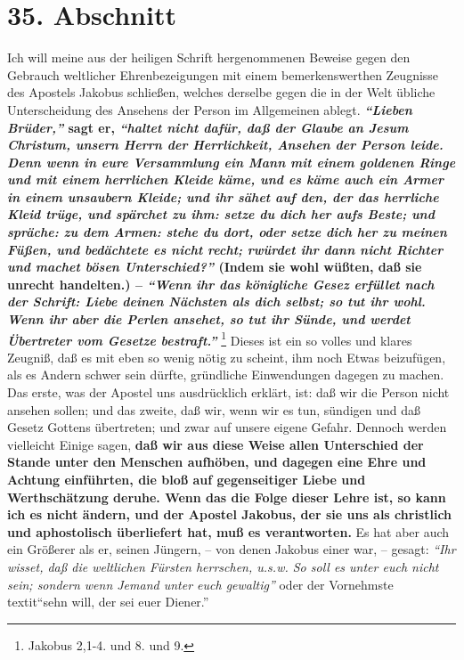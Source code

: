 \section{35. Abschnitt} \label{kap9_ab35}

Ich will meine aus der heiligen Schrift hergenommenen Beweise gegen den Gebrauch
weltlicher Ehrenbezeigungen mit einem bemerkenswerthen Zeugnisse des Apostels
Jakobus schließen, welches derselbe gegen die in der Welt übliche Unterscheidung
des Ansehens der Person im Allgemeinen ablegt.
\textbf{\textit{"`Lieben Brüder,"'} sagt er,
\textit{"`haltet nicht dafür, daß der Glaube an Jesum Christum, unsern Herrn der
Herrlichkeit, Ansehen der Person leide. Denn wenn in eure Versammlung ein Mann
mit einem goldenen Ringe und mit einem herrlichen Kleide käme, und es käme auch
ein Armer in einem unsaubern Kleide; und ihr sähet auf den, der das herrliche
Kleid trüge, und spärchet zu ihm: setze du dich her aufs Beste; und spräche: zu
dem Armen: stehe du dort, oder setze dich her zu meinen Füßen, und bedächtete es
nicht recht; rwürdet ihr dann nicht Richter und machet bösen Unterschied?"'}
(Indem sie wohl wüßten, daß sie unrecht handelten.) --\textit{ "`Wenn ihr das
königliche
Gesez erfüllet nach der Schrift: Liebe deinen Nächsten als dich selbst; so tut
ihr wohl. Wenn ihr aber die Perlen ansehet, so tut ihr Sünde, und werdet
Übertreter vom Gesetze bestraft."'}}
\footnote{Jakobus 2,1-4. und 8. und 9.}
Dieses ist
ein so volles und klares Zeugniß, daß es mit eben so wenig nötig zu scheint, ihm
noch Etwas beizufügen, als es Andern schwer sein dürfte, gründliche Einwendungen
dagegen zu machen. Das erste, was der Apostel uns ausdrücklich erklärt, ist: daß
wir die Person nicht ansehen sollen; und das zweite, daß wir, wenn wir es tun,
sündigen und daß Gesetz Gottens übertreten; und zwar auf unsere eigene Gefahr.
Dennoch werden vielleicht Einige sagen, \textbf{daß wir aus diese Weise allen
Unterschied der Stande unter den Menschen aufhöben, und dagegen eine Ehre und
Achtung einführten, die bloß auf gegenseitiger Liebe und Werthschätzung deruhe.
Wenn das die Folge dieser Lehre ist, so kann ich es nicht ändern, und der
Apostel Jakobus, der sie uns als christlich und aphostolisch überliefert hat,
muß es verantworten.} Es hat aber auch ein Größerer als er, seinen Jüngern, --
von denen Jakobus einer war, -- gesagt:
\textit{"`Ihr wisset, daß die weltlichen Fürsten
herrschen, u.s.w. So soll es unter euch nicht sein; sondern wenn Jemand unter
euch gewaltig"'} oder der Vornehmste\\textit{"`sehn will, der sei euer
Diener."'}
